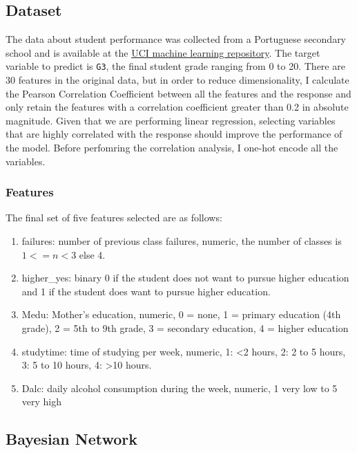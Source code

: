 \documentclass[11pt]{article}
\providecommand{\tightlist}{%
      \setlength{\itemsep}{0pt}\setlength{\parskip}{0pt}}
\begin{document}
\hypertarget{dataset}{%
\subsection{Dataset}\label{dataset}}

The data about student performance was collected from a Portuguese
secondary school and is available at the
\href{http://archive.ics.uci.edu/ml/datasets/Student+Performance}{UCI
machine learning repository}. The target variable to predict is
\texttt{G3}, the final student grade ranging from 0 to 20. There are 30
features in the original data, but in order to reduce dimensionality, I
calculate the Pearson Correlation Coefficient between all the features
and the response and only retain the features with a correlation
coefficient greater than 0.2 in absolute magnitude. Given that we are
performing linear regression, selecting variables that are highly
correlated with the response should improve the performance of the
model. Before perfomring the correlation analysis, I one-hot encode all
the variables.

\hypertarget{features}{%
\subsubsection{Features}\label{features}}

The final set of five features selected are as follows:

\begin{enumerate}
\def\labelenumi{\arabic{enumi}.}
\tightlist
\item
  failures: number of previous class failures, numeric, the number of
  classes is \(1 <= n <3\) else 4.
\item
  higher\_yes: binary 0 if the student does not want to pursue higher
  education and 1 if the student does want to pursue higher education.
\item
  Medu: Mother's education, numeric, 0 = none, 1 = primary education
  (4th grade), 2 = 5th to 9th grade, 3 = secondary education, 4 = higher
  education
\item
  studytime: time of studying per week, numeric, 1: \textless{}2 hours,
  2: 2 to 5 hours, 3: 5 to 10 hours, 4: \textgreater{}10 hours.
\item
  Dalc: daily alcohol consumption during the week, numeric, 1 very low
  to 5 very high
\end{enumerate}

\hypertarget{bayesian-network}{%
\subsection{Bayesian Network}\label{bayesian-network}}
\end{document}
